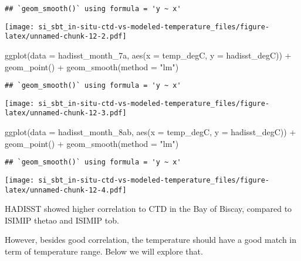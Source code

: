 \documentclass[
]{article}
\newenvironment{Shaded}{\begin{snugshade}}{\end{snugshade}}
\newcommand{\AttributeTok}[1]{\textcolor[rgb]{0.77,0.63,0.00}{#1}}
\newcommand{\FunctionTok}[1]{\textcolor[rgb]{0.00,0.00,0.00}{#1}}
\newcommand{\NormalTok}[1]{#1}
\newcommand{\SpecialCharTok}[1]{\textcolor[rgb]{0.00,0.00,0.00}{#1}}
\newcommand{\StringTok}[1]{\textcolor[rgb]{0.31,0.60,0.02}{#1}}
\begin{document}
\begin{verbatim}
## `geom_smooth()` using formula = 'y ~ x'
\end{verbatim}

\texttt{[image: si\_sbt\_in-situ-ctd-vs-modeled-temperature\_files/figure-latex/unnamed-chunk-12-2.pdf]}

\begin{Shaded}
\begin{Highlighting}[]
\FunctionTok{ggplot}\NormalTok{(}\AttributeTok{data =}\NormalTok{ hadisst\_month\_7a, }\FunctionTok{aes}\NormalTok{(}\AttributeTok{x =}\NormalTok{ temp\_degC, }\AttributeTok{y =}\NormalTok{ hadisst\_degC)) }\SpecialCharTok{+} \FunctionTok{geom\_point}\NormalTok{() }\SpecialCharTok{+} \FunctionTok{geom\_smooth}\NormalTok{(}\AttributeTok{method =} \StringTok{"lm"}\NormalTok{)}
\end{Highlighting}
\end{Shaded}

\begin{verbatim}
## `geom_smooth()` using formula = 'y ~ x'
\end{verbatim}

\texttt{[image: si\_sbt\_in-situ-ctd-vs-modeled-temperature\_files/figure-latex/unnamed-chunk-12-3.pdf]}

\begin{Shaded}
\begin{Highlighting}[]
\FunctionTok{ggplot}\NormalTok{(}\AttributeTok{data =}\NormalTok{ hadisst\_month\_8ab, }\FunctionTok{aes}\NormalTok{(}\AttributeTok{x =}\NormalTok{ temp\_degC, }\AttributeTok{y =}\NormalTok{ hadisst\_degC)) }\SpecialCharTok{+} \FunctionTok{geom\_point}\NormalTok{() }\SpecialCharTok{+} \FunctionTok{geom\_smooth}\NormalTok{(}\AttributeTok{method =} \StringTok{"lm"}\NormalTok{)}
\end{Highlighting}
\end{Shaded}

\begin{verbatim}
## `geom_smooth()` using formula = 'y ~ x'
\end{verbatim}

\texttt{[image: si\_sbt\_in-situ-ctd-vs-modeled-temperature\_files/figure-latex/unnamed-chunk-12-4.pdf]}

HADISST showed higher correlation to CTD in the Bay of Biscay, compared
to ISIMIP thetao and ISIMIP tob.

However, besides good correlation, the temperature should have a good
match in term of temperature range. Below we will explore that.
\end{document}
